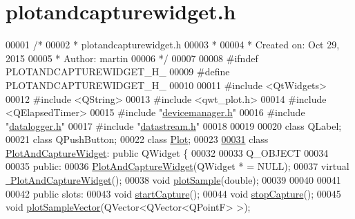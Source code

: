 \hypertarget{plotandcapturewidget_8h_source}{}\section{plotandcapturewidget.\+h}
\label{plotandcapturewidget_8h_source}

\begin{DoxyCode}
00001 \textcolor{comment}{/*}
00002 \textcolor{comment}{ * plotandcapturewidget.h}
00003 \textcolor{comment}{ *}
00004 \textcolor{comment}{ *  Created on: Oct 29, 2015}
00005 \textcolor{comment}{ *      Author: martin}
00006 \textcolor{comment}{ */}
00007 
00008 \textcolor{preprocessor}{#ifndef PLOTANDCAPTUREWIDGET\_H\_}
00009 \textcolor{preprocessor}{#define PLOTANDCAPTUREWIDGET\_H\_}
00010 
00011 \textcolor{preprocessor}{#include <QtWidgets>}
00012 \textcolor{preprocessor}{#include <QString>}
00013 \textcolor{preprocessor}{#include <qwt\_plot.h>}
00014 \textcolor{preprocessor}{#include <QElapsedTimer>}
00015 \textcolor{preprocessor}{#include "\hyperlink{devicemanager_8h}{devicemanager.h}"}
00016 \textcolor{preprocessor}{#include "\hyperlink{datalogger_8h}{datalogger.h}"}
00017 \textcolor{preprocessor}{#include "\hyperlink{datastream_8h}{datastream.h}"}
00018 
00019 
00020 \textcolor{keyword}{class }QLabel;
00021 \textcolor{keyword}{class }QPushButton;
00022 \textcolor{keyword}{class }\hyperlink{classPlot}{Plot};
00023 
\hypertarget{plotandcapturewidget_8h_source.tex_l00031}{}\hyperlink{classPlotAndCaptureWidget}{00031} \textcolor{keyword}{class }\hyperlink{classPlotAndCaptureWidget}{PlotAndCaptureWidget}: \textcolor{keyword}{public} QWidget \{
00032 
00033     Q\_OBJECT
00034 
00035 \textcolor{keyword}{public}:
00036     \hyperlink{classPlotAndCaptureWidget_a12b93ad83cddd745f19c4745a9aa7af9}{PlotAndCaptureWidget}(QWidget * = NULL);
00037     \textcolor{keyword}{virtual} \hyperlink{classPlotAndCaptureWidget_a04d11f3f4d553c39b0d99da1a9ec0a11}{~PlotAndCaptureWidget}();
00038     \textcolor{keywordtype}{void} \hyperlink{classPlotAndCaptureWidget_aeb21bda06882afc4636a311318166202}{plotSample}(\textcolor{keywordtype}{double});
00039 
00040 
00041 
00042 \textcolor{keyword}{public} slots:
00043     \textcolor{keywordtype}{void} \hyperlink{classPlotAndCaptureWidget_a232d01f00a25365382f094ad8eedb7fa}{startCapture}();
00044     \textcolor{keywordtype}{void} \hyperlink{classPlotAndCaptureWidget_a5f9fe948c3683ae9026a8f792782e67e}{stopCapture}();
00045     \textcolor{keywordtype}{void} \hyperlink{classPlotAndCaptureWidget_a7dca31208a65906f0a96bf4143e0da4f}{plotSampleVector}(QVector<QVector<QPointF> >);

\end{DoxyCode}
